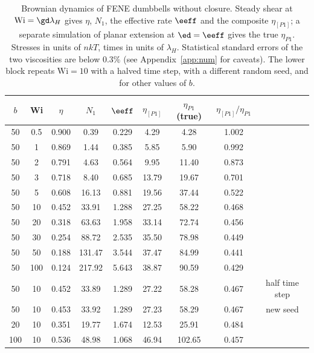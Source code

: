 \begin{table}
\caption{Brownian dynamics of FENE dumbbells without closure. Steady shear at $\mathrm{Wi}=\gd\lambda_H$ gives $\eta$, $N_1$, the effective rate $\eeff$ and the composite $\eta_{[P1]}$; a separate simulation of planar extension at $\ed=\eeff$ gives the true $\eta_{P1}$. Stresses in units of $nkT$, times in units of $\lambda_H$. Statistical standard errors of the two viscosities are below $0.3\%$ (see Appendix~\ref{app:num} for caveats). The lower block repeats $\mathrm{Wi}=10$ with a halved time step, with a different random seed, and for other values of $b$.}\label{tab:bd}
\begin{ruledtabular}
\begin{tabular}{ccccccccc}
$b$ & Wi & $\eta$ & $N_1$ & $\eeff$ & $\eta_{[P1]}$ & $\eta_{P1}$ (true) & $\eta_{[P1]}/\eta_{P1}$ & \\
\hline
50 & 0.5 & 0.900 & 0.39 & 0.229 & 4.29 & 4.28 & 1.002 & \\
50 & 1 & 0.869 & 1.44 & 0.385 & 5.85 & 5.90 & 0.992 & \\
50 & 2 & 0.791 & 4.63 & 0.564 & 9.95 & 11.40 & 0.873 & \\
50 & 3 & 0.718 & 8.40 & 0.685 & 13.79 & 19.67 & 0.701 & \\
50 & 5 & 0.608 & 16.13 & 0.881 & 19.56 & 37.44 & 0.522 & \\
50 & 10 & 0.452 & 33.91 & 1.288 & 27.25 & 58.22 & 0.468 & \\
50 & 20 & 0.318 & 63.63 & 1.958 & 33.14 & 72.74 & 0.456 & \\
50 & 30 & 0.254 & 88.72 & 2.535 & 35.50 & 78.98 & 0.449 & \\
50 & 50 & 0.188 & 131.47 & 3.544 & 37.47 & 84.99 & 0.441 & \\
50 & 100 & 0.124 & 217.92 & 5.643 & 38.87 & 90.59 & 0.429 & \\
\hline
50 & 10 & 0.452 & 33.89 & 1.289 & 27.22 & 58.28 & 0.467 & half time step\\
50 & 10 & 0.453 & 33.92 & 1.289 & 27.23 & 58.29 & 0.467 & new seed\\
20 & 10 & 0.351 & 19.77 & 1.674 & 12.53 & 25.91 & 0.484 & \\
100 & 10 & 0.536 & 48.98 & 1.068 & 46.94 & 102.65 & 0.457 & \\
\end{tabular}
\end{ruledtabular}
\end{table}
